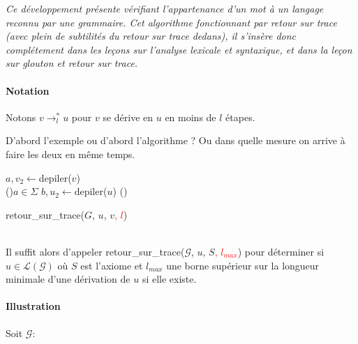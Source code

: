 
\textit{Ce développement présente vérifiant l'appartenance d'un mot à un langage reconnu par une grammaire. Cet algorithme fonctionnant par retour sur trace (avec plein de subtilités du retour sur trace dedans), il s'insère donc complétement dans les leçons sur l'analyse lexicale et syntaxique, et dans la leçon sur glouton et retour sur trace.}

\paragraph{Notation} Notons $v\rightarrow^*_l u$ pour $v$ se dérive en $u$ en moins de $l$ étapes.

\begin{com}
	D'abord l'exemple ou d'abord l'algorithme ? Ou dans quelle mesure on arrive à faire les deux en même temps.
\end{com}

\begin{algorithm}[H]
	\textcolor{red}{}
	$a, v_2 \gets $depiler($v$)\\
	\eSi(){$a \in \Sigma$ }{
		$b, u_2 \gets $depiler($u$) 
	}(){
	}
	\caption{retour\_sur\_trace($G$, $u$, $v$\textcolor{red}{, $l$})}
\end{algorithm} \enspace \\

Il suffit alors d'appeler retour\_sur\_trace($\mathcal G$, $u$, $S$\textcolor{red}{, $l_{max}$})  pour déterminer si $u\in \mathcal{L(G)}$ où $S$ est l'axiome et $l_{max}$ une borne supérieur sur la longueur minimale d'une dérivation de $u$ si elle existe.

\paragraph{Illustration} Soit $\mathcal G$: 

